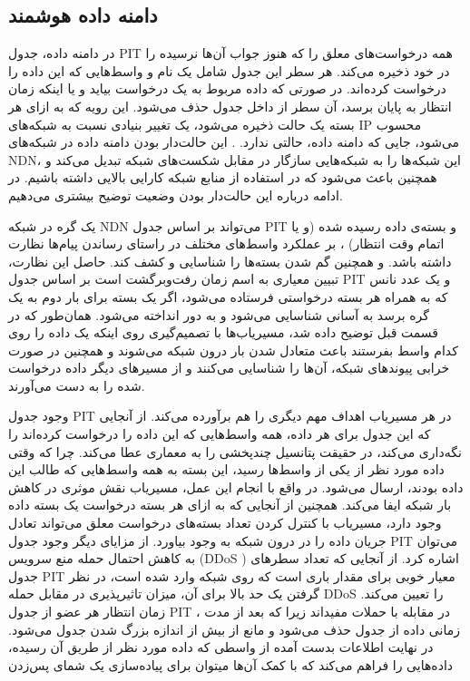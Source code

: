  
\subsection{دامنه داده هوشمند}
در دامنه داده، جدول PIT همه درخواست‌های معلق را که هنوز جواب آن‌ها نرسیده را در خود ذخیره می‌کند. هر سطر این جدول شامل یک نام و واسط‌هایی که این داده را درخواست کرده‌اند. در صورتی که داده مربوط به یک درخواست بیاید و یا اینکه زمان انتظار به پایان برسد، آن سطر از داخل جدول حذف می‌شود. این رویه که به ازای هر بسته یک حالت ذخیره می‌شود، یک تغییر بنیادی نسبت به شبکه‌های IP محسوب می‌شود، جایی که دامنه داده، حالتی ندارد.    . این حالت‌دار بودن دامنه داده در شبکه‌های NDN، این شبکه‌ها را به شبکه‌هایی سازگار در مقابل شکست‌های شبکه تبدیل می‌کند و همچنین باعث می‌شود که در استفاده از منابع شبکه کارایی بالایی داشته باشیم. در ادامه درباره این حالت‌دار بودن وضعیت توضیح بیشتری می‌دهیم. 

 یک گره در شبکه NDN  می‌تواند بر اساس جدول PIT و بسته‌ی داده رسیده شده (‌و یا اتمام وقت انتظار) ،  بر عملکرد واسط‌های مختلف در راستای رساندن پیام‌ها نظارت داشته باشد. و همچنین گم شدن بسته‌ها را شناسایی و کشف کند. حاصل این نظارت، تبیین معیاری به اسم زمان رفت‌وبرگشت است  بر اساس جدول PIT  و یک عدد نانس که به همراه هر بسته درخواستی فرستاده می‌شود، اگر یک بسته برای بار دوم به یک گره برسد به آسانی شناسایی می‌شود و به دور انداخته می‌شود. همان‌طور که در قسمت قبل توضیح داده‌ شد، مسیریاب‌ها با تصمیم‌گیری روی اینکه یک داده را روی کدام واسط بفرستند باعث متعادل شدن بار درون شبکه می‌شوند و همچنین در صورت خرابی پیوندهای شبکه، آن‌ها را شناسایی می‌کنند و از مسیرهای دیگر داده درخواست شده را به دست می‌آورند. 
 
وجود جدول PIT  در هر مسیریاب اهداف مهم دیگری را هم برآورده می‌کند. از آنجایی که این جدول برای هر داده، همه واسط‌هایی که این داده را درخواست کرده‌اند را نگه‌داری می‌کند، در حقیقت پتانسیل چندپخشی را به معماری عطا می‌کند. چرا که وقتی داده مورد نظر از یکی از واسط‌ها رسید، این بسته به همه واسط‌هایی که طالب این داده بودند، ارسال می‌شود. در واقع با انجام این عمل، مسیریاب نقش موثری در کاهش بار شبکه ایفا می‌کند. همچنین از آنجایی که به ازای هر بسته درخواست یک بسته داده وجود دارد، مسیریاب با کنترل کردن تعداد بسته‌های درخواست معلق می‌تواند تعادل جریان داده را در درون شبکه به وجود بیاورد.  از مزایای دیگر وجود جدول PIT می‌توان به کاهش احتمال حمله منع سرویس 
(DDoS )
 اشاره کرد. از آنجایی که تعداد سطر‌های جدول PIT  معیار خوبی برای مقدار باری است که روی شبکه وارد شده است، در نظر گرفتن یک حد بالا برای آن، میزان تاثیرپذیری در مقابل حمله DDoS را تعیین می‌کند. زمان انتظار هر عضو از جدول PIT ، در مقابله با حملات مفید‌اند زیرا که بعد از مدت زمانی داده از جدول حذف می‌شود و مانع از بیش از اندازه بزرگ شدن جدول می‌شود.
\cite{lads}
در نهایت اطلاعات بدست آمده از واسطی که داده مورد نظر از طریق آن رسیده، داده‌هایی را فراهم می‌کند که با کمک آن‌‌ها میتوان برای  پیاده‌سازی یک شمای پس‌زدن
\cite{pushback}
 
